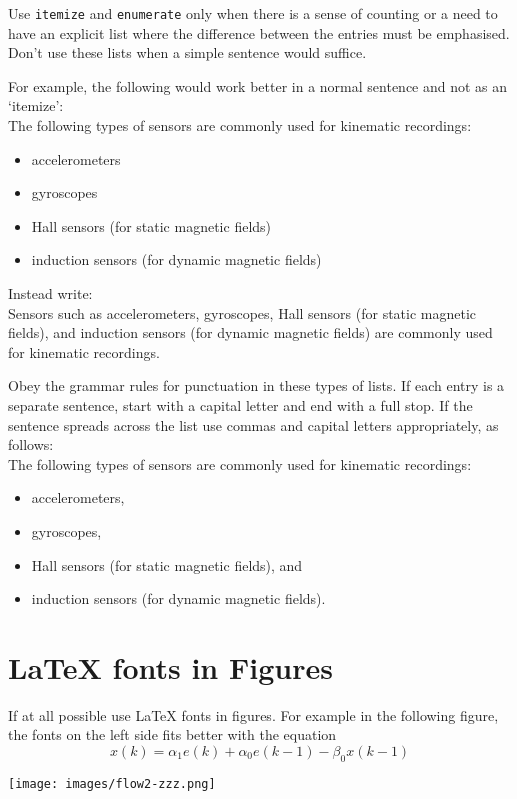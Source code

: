 \documentclass[english]{workpackage}[1996/06/02]
\begin{document}
Use \verb+itemize+ and \verb+enumerate+ only when there is a sense of counting or a need to have an explicit list where the difference between the entries must be emphasised. Don't use these lists when a simple sentence would suffice.

For example, the following would work better in a normal sentence and not as an `itemize':\\
The following types of sensors are commonly used for kinematic recordings:
\begin{itemize}
\item accelerometers
\item gyroscopes
\item Hall sensors (for static magnetic fields)
\item induction sensors (for dynamic magnetic fields)
\end{itemize}
Instead write:\\
Sensors such as accelerometers, gyroscopes, Hall sensors (for static magnetic fields), and induction sensors (for dynamic magnetic fields) are commonly used for kinematic recordings.

Obey the grammar rules for punctuation in these types of lists. If each entry is a separate sentence, start with a capital letter and end with a full stop.  If the sentence spreads across the list use commas and capital letters appropriately, as follows:\\
The following types of sensors are commonly used for kinematic recordings:
\begin{itemize}
\item accelerometers,
\item gyroscopes,
\item Hall sensors (for static magnetic fields), and
\item induction sensors (for dynamic magnetic fields).
\end{itemize}

\section{\LaTeX{} fonts in Figures}
\label{sec:LaTeXfontsinFigures}

If at all possible use \LaTeX{} fonts in figures. For example in the following figure, the fonts on the left side fits better with the equation
\begin{equation}
x(k)=\alpha_1 e(k)+\alpha_0 e(k-1)-\beta_0 x(k-1)
\end{equation}
\begin{center}
\texttt{[image: images/flow2-zzz.png]}
\end{center}
\end{document}
